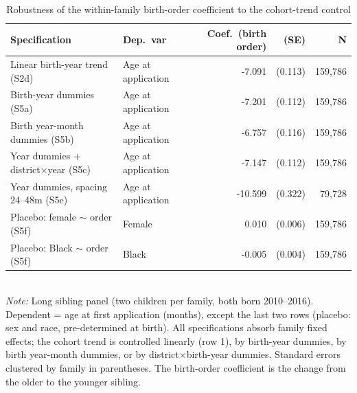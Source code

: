 \begin{table}[htbp]\centering
\caption{Robustness of the within-family birth-order coefficient to the cohort-trend control}
\label{tab:S5_robustez}
\small
\begin{tabular}{llrrr}
\toprule
Specification & Dep.\ var & Coef.\ (birth order) & (SE) & N \\
\midrule
Linear birth-year trend (S2d) & Age at application & -7.091 & (0.113) & 159,786 \\
Birth-year dummies (S5a) & Age at application & -7.201 & (0.112) & 159,786 \\
Birth year-month dummies (S5b) & Age at application & -6.757 & (0.116) & 159,786 \\
Year dummies + district$\times$year (S5c) & Age at application & -7.147 & (0.112) & 159,786 \\
Year dummies, spacing 24--48m (S5e) & Age at application & -10.599 & (0.322) & 79,728 \\
Placebo: female $\sim$ order (S5f) & Female & 0.010 & (0.006) & 159,786 \\
Placebo: Black $\sim$ order (S5f) & Black & -0.005 & (0.004) & 159,786 \\
\bottomrule
\end{tabular}
\\[3pt]{\footnotesize \textit{Note:} Long sibling panel (two children per family, both born 2010--2016). Dependent = age at first application (months), except the last two rows (placebo: sex and race, pre-determined at birth). All specifications absorb family fixed effects; the cohort trend is controlled linearly (row 1), by birth-year dummies, by birth year-month dummies, or by district$\times$birth-year dummies. Standard errors clustered by family in parentheses. The birth-order coefficient is the change from the older to the younger sibling.}
\end{table}
